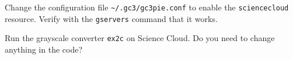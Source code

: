 \documentclass[english,serif,mathserif,xcolor=pdftex,dvipsnames,table]{beamer}
\begin{document}
\begin{frame}
  \begin{exercise*}[2.D]
    Change the configuration file
    \texttt{{\textasciitilde}/.gc3/gc3pie.conf} to enable the
    \texttt{sciencecloud} resource.  Verify with the \texttt{gservers}
    command that it works.
  \end{exercise*}

  \+
  \begin{exercise*}[2.E]
    Run the grayscale converter \texttt{ex2c} on Science Cloud.
    Do you need to change anything in the code?
  \end{exercise*}
\end{frame}
\end{document}
